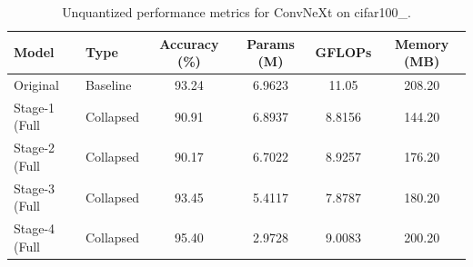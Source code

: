 \begin{table}
\caption{Unquantized performance metrics for ConvNeXt on cifar100_.}
\label{tab:ConvNeXt_cifar100__unquant}
\begin{tabular}{llcccc}
\toprule
Model & Type & Accuracy (\%) & Params (M) & GFLOPs & Memory (MB) \\
\midrule
Original & Baseline & 93.24 & 6.9623 & 11.05 & 208.20 \\
Stage-1 (Full & Collapsed & 90.91 & 6.8937 & 8.8156 & 144.20 \\
Stage-2 (Full & Collapsed & 90.17 & 6.7022 & 8.9257 & 176.20 \\
Stage-3 (Full & Collapsed & 93.45 & 5.4117 & 7.8787 & 180.20 \\
Stage-4 (Full & Collapsed & 95.40 & 2.9728 & 9.0083 & 200.20 \\
\bottomrule
\end{tabular}
\end{table}
